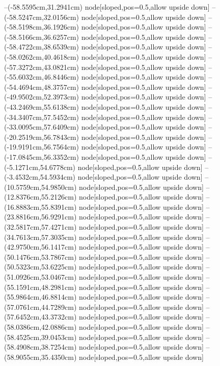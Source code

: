 --(-58.5595cm,31.2941cm) node[sloped,pos=0.5,allow upside down]{\ArrowIn}
--(-58.5247cm,32.0156cm) node[sloped,pos=0.5,allow upside down]{\arrowIn}
--(-58.5198cm,36.1926cm) node[sloped,pos=0.5,allow upside down]{\ArrowIn}
--(-58.5166cm,36.6257cm) node[sloped,pos=0.5,allow upside down]{\arrowIn}
--(-58.4722cm,38.6539cm) node[sloped,pos=0.5,allow upside down]{\ArrowIn}
--(-58.0262cm,40.4618cm) node[sloped,pos=0.5,allow upside down]{\ArrowIn}
--(-57.3272cm,43.0821cm) node[sloped,pos=0.5,allow upside down]{\ArrowIn}
--(-55.6032cm,46.8446cm) node[sloped,pos=0.5,allow upside down]{\ArrowIn}
--(-54.4694cm,48.3757cm) node[sloped,pos=0.5,allow upside down]{\ArrowIn}
--(-49.9502cm,52.3973cm) node[sloped,pos=0.5,allow upside down]{\ArrowIn}
--(-43.2469cm,55.6138cm) node[sloped,pos=0.5,allow upside down]{\ArrowIn}
--(-34.3407cm,57.5452cm) node[sloped,pos=0.5,allow upside down]{\ArrowIn}
--(-33.0095cm,57.6409cm) node[sloped,pos=0.5,allow upside down]{\ArrowIn}
--(-20.2519cm,56.7843cm) node[sloped,pos=0.5,allow upside down]{\ArrowIn}
--(-19.9191cm,56.7564cm) node[sloped,pos=0.5,allow upside down]{\arrowIn}
--(-17.0845cm,56.3352cm) node[sloped,pos=0.5,allow upside down]{\ArrowIn}
--(-5.1271cm,54.6778cm) node[sloped,pos=0.5,allow upside down]{\ArrowIn}
--(-3.4532cm,54.5934cm) node[sloped,pos=0.5,allow upside down]{\ArrowIn}
--(10.5759cm,54.9850cm) node[sloped,pos=0.5,allow upside down]{\ArrowIn}
--(12.8376cm,55.2126cm) node[sloped,pos=0.5,allow upside down]{\ArrowIn}
--(16.8883cm,55.8391cm) node[sloped,pos=0.5,allow upside down]{\ArrowIn}
--(23.8816cm,56.9291cm) node[sloped,pos=0.5,allow upside down]{\ArrowIn}
--(32.5817cm,57.4271cm) node[sloped,pos=0.5,allow upside down]{\ArrowIn}
--(34.7613cm,57.3035cm) node[sloped,pos=0.5,allow upside down]{\ArrowIn}
--(42.9750cm,56.1417cm) node[sloped,pos=0.5,allow upside down]{\ArrowIn}
--(50.1476cm,53.7867cm) node[sloped,pos=0.5,allow upside down]{\ArrowIn}
--(50.5323cm,53.6225cm) node[sloped,pos=0.5,allow upside down]{\arrowIn}
--(51.0926cm,53.0467cm) node[sloped,pos=0.5,allow upside down]{\arrowIn}
--(55.1591cm,48.2981cm) node[sloped,pos=0.5,allow upside down]{\ArrowIn}
--(55.9864cm,46.8814cm) node[sloped,pos=0.5,allow upside down]{\ArrowIn}
--(57.0761cm,44.7289cm) node[sloped,pos=0.5,allow upside down]{\ArrowIn}
--(57.6452cm,43.3732cm) node[sloped,pos=0.5,allow upside down]{\ArrowIn}
--(58.0386cm,42.0886cm) node[sloped,pos=0.5,allow upside down]{\ArrowIn}
--(58.4525cm,39.0453cm) node[sloped,pos=0.5,allow upside down]{\ArrowIn}
--(58.4908cm,38.7254cm) node[sloped,pos=0.5,allow upside down]{\arrowIn}
--(58.9055cm,35.4350cm) node[sloped,pos=0.5,allow upside down]{\ArrowIn}
